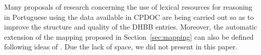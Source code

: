 \documentclass{llncs}
\begin{document}


Many proposals of research concerning the use of lexical resources for
reasoning in Portuguese using the data available in CPDOC are being
carried out so as to improve the structure and quality of the DHBB
entries. Moreover, the automatic extension of the mapping proposed in
Section~\ref{sec:mapping} can also be defined following ideas of
\cite{onto-context}. Due the lack of space, we did not present in this
paper.



\end{document}
